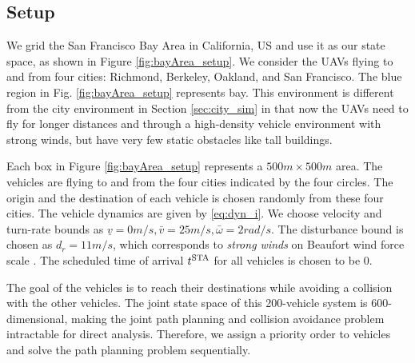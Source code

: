 \subsection{Setup \label{sec:bayArea_simSetup}}
We grid the San Francisco Bay Area in California, US and use it as our state space, as shown in Figure \ref{fig:bayArea_setup}. We consider the UAVs flying to and from four cities: Richmond, Berkeley, Oakland, and San Francisco. The blue region in Fig. \ref{fig:bayArea_setup} represents bay. This environment is different from the city environment in Section \ref{sec:city_sim} in that now the UAVs need to fly for longer distances and through a high-density vehicle environment with strong winds, but have very few static obstacles like tall buildings.    

Each box in Figure \ref{fig:bayArea_setup} represents a $500m \times 500m$ area. The vehicles are flying to and from the four cities indicated by the four circles. The origin and the destination of each vehicle is chosen randomly from these four cities. The vehicle dynamics are given by \eqref{eq:dyn_i}. We choose velocity and turn-rate bounds as $\underline{v} = 0m/s, \bar{v} = 25m/s, \bar\omega = 2 rad/s$. The disturbance bound is chosen as $d_{r} = 11 m/s$, which corresponds to \textit{strong winds} on Beaufort wind force scale \cite{Windscale}. The scheduled time of arrival $t^\text{STA}$ for all vehicles is chosen to be $0$. 

The goal of the vehicles is to reach their destinations while avoiding a collision with the other vehicles. The joint state space of this 200-vehicle system is 600-dimensional, making the joint path planning and collision avoidance problem intractable for direct analysis. Therefore, we assign a priority order to vehicles and solve the path planning problem sequentially.